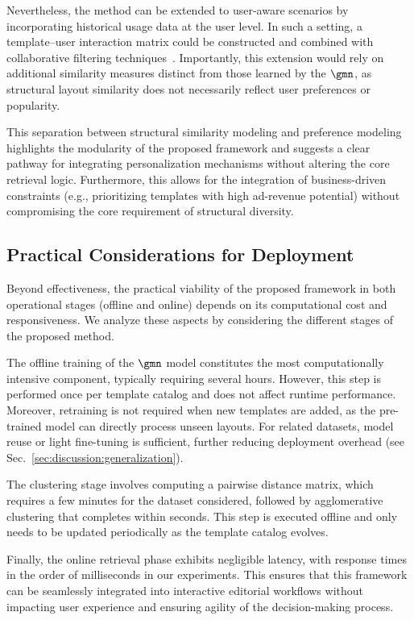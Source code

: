 Nevertheless, the method can be extended to user-aware scenarios by incorporating historical usage data at the user level. In such a setting, a template--user interaction matrix could be constructed and combined with collaborative filtering techniques~\cite{cf-techniques}. Importantly, this extension would rely on additional similarity measures distinct from those learned by the $\gmn$, as structural layout similarity does not necessarily reflect user preferences or popularity.

This separation between structural similarity modeling and preference modeling highlights the modularity of the proposed framework and suggests a clear pathway for integrating personalization mechanisms without altering the core retrieval logic. Furthermore, this allows for the integration of business-driven constraints (e.g., prioritizing templates with high ad-revenue potential) without compromising the core requirement of structural diversity.

\subsection{Practical Considerations for Deployment}

Beyond effectiveness, the practical viability of the proposed framework in both operational stages (offline and online) depends on its computational cost and responsiveness. We analyze these aspects by considering the different stages of the proposed method.

The offline training of the $\gmn$ model constitutes the most computationally intensive component, typically requiring several hours. However, this step is performed once per template catalog and does not affect runtime performance. Moreover, retraining is not required when new templates are added, as the pre-trained model can directly process unseen layouts. For related datasets, model reuse or light fine-tuning is sufficient, further reducing deployment overhead (see Sec.~\ref{sec:discussion:generalization}).

The clustering stage involves computing a pairwise distance matrix, which requires a few minutes for the dataset considered, followed by agglomerative clustering that completes within seconds. This step is executed offline and only needs to be updated periodically as the template catalog evolves.

Finally, the online retrieval phase exhibits negligible latency, with response times in the order of milliseconds in our experiments. This ensures that this framework can be seamlessly integrated into interactive editorial workflows without impacting user experience and ensuring agility of the decision-making process.

